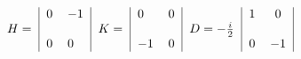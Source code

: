 \begin{equation}\label{MatrixGenerators}
\begin{tabular}{c|ll|c|ll|c|lc|c}
    &$0$&$-1$&    &$0$ &$0$&                &$1$&$0$ &\\
$H=$&   &    &$K=$&    &   &$D=-\frac{i}{2}$&   &    &\\
    &$0$&$0$ &    &$-1$&$0$&                &$0$&$-1$&\\
\end{tabular}\\
\end{equation}

